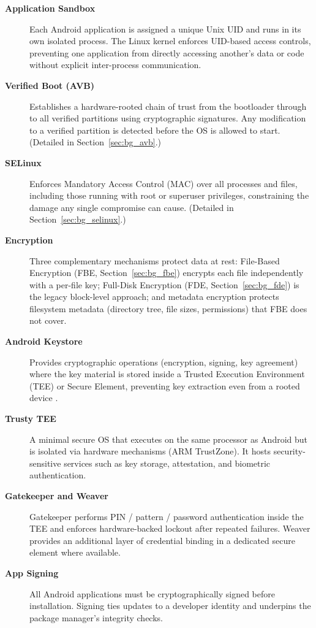 \begin{description}
    \item[\textbf{Application Sandbox}]
    Each Android application is assigned a unique Unix UID and runs in its own isolated process. The Linux kernel enforces UID-based access controls, preventing one application from directly accessing another's data or code without explicit inter-process communication.

    \item[\textbf{Verified Boot (AVB)}]
    Establishes a hardware-rooted chain of trust from the bootloader through to all verified partitions using cryptographic signatures. Any modification to a verified partition is detected before the OS is allowed to start. (Detailed in Section~\ref{sec:bg_avb}.)

    \item[\textbf{SELinux}]
    Enforces Mandatory Access Control (MAC) over all processes and files, including those running with root or superuser privileges, constraining the damage any single compromise can cause.
    (Detailed in Section~\ref{sec:bg_selinux}.)

    \item[\textbf{Encryption}]
    Three complementary mechanisms protect data at rest: File-Based Encryption (FBE, Section~\ref{sec:bg_fbe}) encrypts each file independently with a per-file key; Full-Disk Encryption (FDE, Section~\ref{sec:bg_fde}) is the legacy block-level approach; and metadata encryption protects filesystem metadata (directory tree, file sizes, permissions) that FBE does not cover.

    \item[\textbf{Android Keystore}]
    Provides cryptographic operations (encryption, signing, key agreement) where the key material is stored inside a Trusted Execution Environment (TEE) or Secure Element, preventing key extraction even from a rooted device \cite{android_security_features}.

    \item[\textbf{Trusty TEE}]
    A minimal secure OS that executes on the same processor as Android but is isolated via hardware mechanisms (ARM TrustZone). It hosts security-sensitive services such as key storage, attestation, and biometric authentication.

    \item[\textbf{Gatekeeper and Weaver}]
    Gatekeeper performs PIN / pattern / password authentication inside the TEE and enforces hardware-backed lockout after repeated failures. Weaver provides an additional layer of credential binding in a dedicated secure element where available.

    \item[\textbf{App Signing}]
    All Android applications must be cryptographically signed before installation. Signing ties updates to a developer identity and underpins the package manager's integrity checks.
\end{description}

